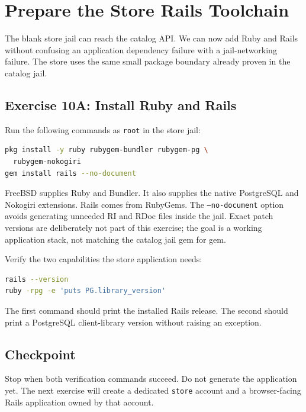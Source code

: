 \chapter{Prepare the Store Rails Toolchain}

The blank store jail can reach the catalog API. We can now add Ruby and Rails
without confusing an application dependency failure with a jail-networking
failure. The store uses the same small package boundary already proven in the
catalog jail.

\section{Exercise 10A: Install Ruby and Rails}

Run the following commands as \texttt{root} in the store jail:

\begin{lstlisting}[language=sh]
pkg install -y ruby rubygem-bundler rubygem-pg \
  rubygem-nokogiri
gem install rails --no-document
\end{lstlisting}

FreeBSD supplies Ruby and Bundler. It also supplies the native PostgreSQL and
Nokogiri extensions. Rails comes from RubyGems. The \texttt{--no-document}
option avoids generating unneeded RI and RDoc files inside the jail. Exact
patch versions are deliberately not part of this exercise; the goal is a
working application stack, not matching the catalog jail gem for gem.

Verify the two capabilities the store application needs:

\begin{lstlisting}[language=sh]
rails --version
ruby -rpg -e 'puts PG.library_version'
\end{lstlisting}

The first command should print the installed Rails release. The second should
print a PostgreSQL client-library version without raising an exception.

\section{Checkpoint}

Stop when both verification commands succeed. Do not generate the application
yet. The next exercise will create a dedicated \texttt{store} account and a
browser-facing Rails application owned by that account.
